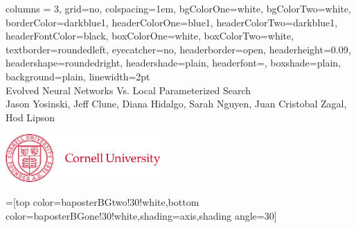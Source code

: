\documentclass[portrait,final]{baposter}
\begin{document}
\begin{poster}{
  columns = 3,
  grid=no,
  colspacing=1em,
  bgColorOne=white,
  bgColorTwo=white,
  borderColor=darkblue1,
  headerColorOne=blue1,
  headerColorTwo=darkblue1,
  headerFontColor=black,
  boxColorOne=white,
  boxColorTwo=white,
  textborder=roundedleft,
  eyecatcher=no,
  headerborder=open,
  headerheight=0.09\textheight,
  headershape=roundedright,
  headershade=plain,
  headerfont=\normalsize\textsf, %
  boxshade=plain,
  background=plain,
  linewidth=2pt
  }
  {} %
  {\sf %
  \vspace{0em}{\huge Generating Gaits for Physical Quadruped Robots:} \\{\LARGE Evolved Neural Networks Vs. Local Parameterized Search}}
  {\sf %
  \vspace{.3em}\\{\normalsize Jason Yosinski, Jeff Clune, Diana Hidalgo, Sarah Nguyen, Juan Cristobal Zagal, Hod Lipson}\\\hspace{0.3em}
  \hspace{3em}
  }
  {{\begin{minipage}{.25\textwidth}
    \hfill
    \includegraphics[height=5.0em]{cornellLogo}
  \end{minipage}}
  }

  =[top color=baposterBGtwo!30!white,bottom color=baposterBGone!30!white,shading=axis,shading angle=30]

     \newlength{\leftimgwidth}
     \setlength{\leftimgwidth}{0.78em+8.0em}


\end{poster}
\end{document}
